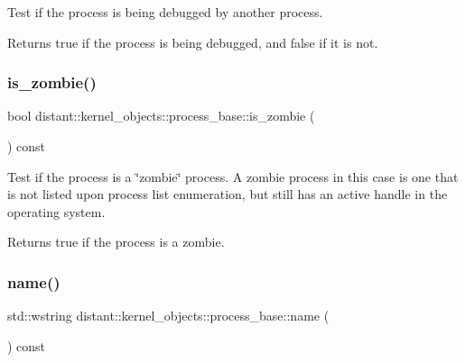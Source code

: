 Test if the process is being debugged by another process. 

\begin{DoxyReturn}{Returns}
true if the process is being debugged, and false if it is not. 
\end{DoxyReturn}
\mbox{\label{classdistant_1_1kernel__objects_1_1process__base_ab023cd4a4d27ccef7879d1a3c513148b}} 
\subsubsection{\texorpdfstring{is\+\_\+zombie()}{is\_zombie()}}
{\footnotesize\ttfamily bool distant\+::kernel\+\_\+objects\+::process\+\_\+base\+::is\+\_\+zombie (\begin{DoxyParamCaption}{ }\end{DoxyParamCaption}) const\hspace{0.3cm}{\ttfamily [inline]}}



Test if the process is a \char`\"{}zombie\char`\"{} process. A zombie process in this case is one that is not listed upon process list enumeration, but still has an active handle in the operating system. 

\begin{DoxyReturn}{Returns}
true if the process is a zombie. 
\end{DoxyReturn}
\mbox{\label{classdistant_1_1kernel__objects_1_1process__base_a465314221bd0fbea3ce48ffcf7213578}} 
\subsubsection{\texorpdfstring{name()}{name()}}
{\footnotesize\ttfamily std\+::wstring distant\+::kernel\+\_\+objects\+::process\+\_\+base\+::name (\begin{DoxyParamCaption}{ }\end{DoxyParamCaption}) const\hspace{0.3cm}{\ttfamily [inline]}}



